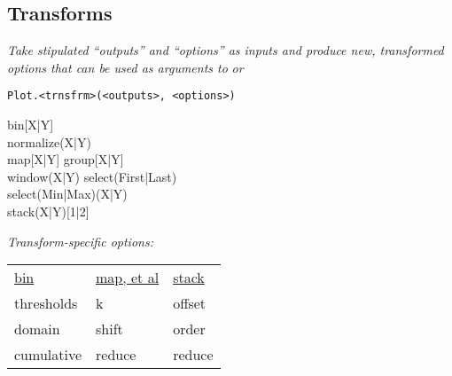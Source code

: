 \subsection*{Transforms}
\textit{Take stipulated ``outputs'' and ``options'' as inputs and produce new, transformed options that can be used as arguments to }\textit{ or }
\begin{lstlisting}
Plot.<trnsfrm>(<outputs>, <options>)
\end{lstlisting}

\api
{\widththree}{bin[X|Y] \\ normalize(X|Y) \\ map[X|Y] }
{\widththree}{group[X|Y] \\ window(X|Y)}
{\widththree}{select(First|Last) \\ select(Min|Max)(X|Y) \\ stack(X|Y)[1|2]}
\stopapi

\vspace{1mm}
\textit{Transform-specific options:}\\
\begin{tabular}{l l l}
    \ul{bin}   & \ul{map, et al} & \ul{stack}   \\
    thresholds & k               & offset       \\
    domain     & shift           & order        \\
    cumulative & reduce          & reduce       \\
\end{tabular}

